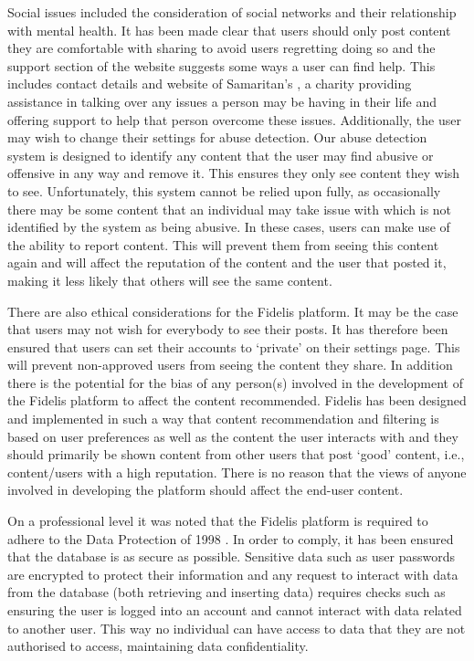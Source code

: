 Social issues included the consideration of social networks and their relationship with mental health. It has been made clear that users should only post content they are comfortable with sharing to avoid users regretting doing so and the support section of the website suggests some ways a user can find help. This includes contact details and website of Samaritan's \cite{Samaritans:Home}, a charity providing assistance in talking over any issues a person may be having in their life and offering support to help that person overcome these issues. Additionally, the user may wish to change their settings for abuse detection. Our abuse detection system is designed to identify any content that the user may find abusive or offensive in any way and remove it. This ensures they only see content they wish to see. Unfortunately, this system cannot be relied upon fully, as occasionally there may be some content that an individual may take issue with which is not identified by the system as being abusive. In these cases, users can make use of the ability to report content. This will prevent them from seeing this content again and will affect the reputation of the content and the user that posted it, making it less likely that others will see the same content.

There are also ethical considerations for the Fidelis platform. It may be the case that users may not wish for everybody to see their posts. It has therefore been ensured that users can set their accounts to `private' on their settings page. This will prevent non-approved users from seeing the content they share. In addition there is the potential for the bias of any person(s) involved in the development of the Fidelis platform to affect the content recommended. Fidelis has been designed and implemented in such a way that content recommendation and filtering is based on user preferences as well as the content the user interacts with and they should primarily be shown content from other users that post `good' content, i.e., content/users with a high reputation. There is no reason that the views of anyone involved in developing the platform should affect the end-user content.

On a professional level it was noted that the Fidelis platform is required to adhere to the Data Protection of 1998 \cite{DPA}. In order to comply, it has been ensured that the database is as secure as possible. Sensitive data such as user passwords are encrypted to protect their information and any request to interact with data from the database (both retrieving and inserting data) requires checks such as ensuring the user is logged into an account and cannot interact with data related to another user. This way no individual can have access to data that they are not authorised to access, maintaining data confidentiality.


